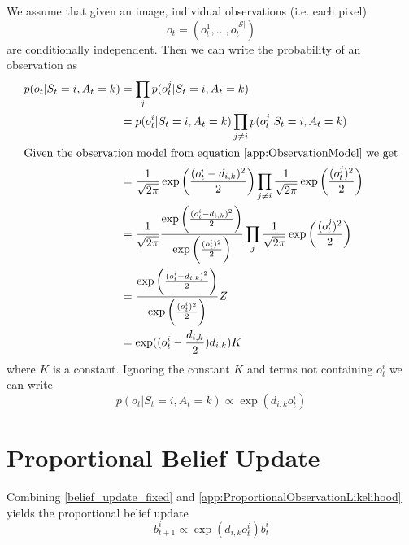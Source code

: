 We assume that given an image, individual observations (i.e. each pixel)
\begin{equation}
  o_t = (o_t^1, \dotsc, o_t^{|\mathcal{S}|})
\end{equation}
are conditionally independent. Then we can write the probability of an observation as
\begin{subequations}
  \begin{align}
    p(o_t | S_t = i, A_t = k) 
      &= \prod_j p(o_t^j | S_t = i, A_t = k) \\
      &= p(o_t^i | S_t = i, A_t = k) \prod_{j \neq i} p(o_t^j | S_t = i, A_t = k) \\
      \intertext{Given the observation model from equation \eqref{app:ObservationModel} we get}
      &= \frac{1}{\sqrt{2 \pi}} \exp\bigg(\frac{(o_t^i - d_{i,k})^2}{2}\bigg) \prod_{j \neq i} \frac{1}{\sqrt{2 \pi}} \exp\bigg(\frac{(o_t^j)^2}{2}\bigg) \\
      &= \frac{1}{\sqrt{2\pi}} \frac{\exp\bigg(\frac{(o_t^i - d_{i,k})^2}{2}\bigg)}{\exp\bigg(\frac{(o_t^i)^2}{2}\bigg)} \prod_j \frac{1}{\sqrt{2 \pi}} \exp\bigg(\frac{(o_t^j)^2}{2}\bigg) \\
      &= \frac{\exp\bigg(\frac{(o_t^i - d_{i,k})^2}{2}\bigg)}{\exp\bigg(\frac{(o_t^i)^2}{2}\bigg)} Z \\
      &= \exp((o_t^i - \frac{d_{i,k}}{2}) d_{i,k}) K
  \end{align}
\end{subequations}
where $K$ is a constant. Ignoring the constant $K$ and terms not containing $o_t^i$ we can write
\begin{equation}
  \label{app:ProportionalObservationLikelihood}
  p(o_t | S_t = i, A_t = k) \propto \exp{(d_{i,k} o_t^i)}
\end{equation}

\section{Proportional Belief Update}
Combining \eqref{belief_update_fixed} and \eqref{app:ProportionalObservationLikelihood} yields the proportional belief update
\begin{equation}
  b_{t+1}^i \propto \exp{(d_{i,k} o_t^i)} b_t^i
\end{equation}
